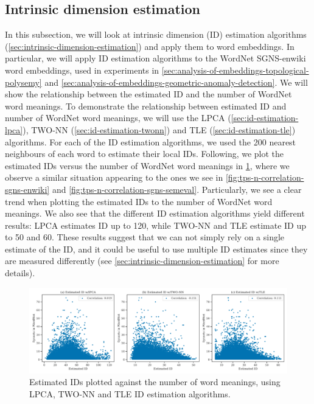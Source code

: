 \subsection{Intrinsic dimension estimation}
\label{sec:analysis-of-embeddings-intrinsic-dimension-estimation}
In this subsection, we will look at intrinsic dimension (ID) estimation algorithms (\cref{sec:intrinsic-dimension-estimation}) and apply them to word embeddings. In particular, we will apply ID estimation algorithms to the WordNet SGNS-enwiki word embeddings, used in experiments in \cref{sec:analysis-of-embeddings-topological-polysemy} and \cref{sec:analysis-of-embeddings-geometric-anomaly-detection}. We will show the relationship between the estimated ID and the number of WordNet word meanings. To demonstrate the relationship between estimated ID and number of WordNet word meanings, we will use the LPCA (\cref{sec:id-estimation-lpca}), TWO-NN (\cref{sec:id-estimation-twonn}) and TLE (\cref{sec:id-estimation-tle}) algorithms. For each of the ID estimation algorithms, we used the 200 nearest neighbours of each word to estimate their local IDs. Following, we plot the estimated IDs versus the number of WordNet word meanings in \cref{fig:intrinsic-dimension-estimation-vs-wordnet-synsets}, where we observe a similar situation appearing to the ones we see in \cref{fig:tps-n-correlation-sgns-enwiki} and \cref{fig:tps-n-correlation-sgns-semeval}. Particularly, we see a clear trend when plotting the estimated IDs to the number of WordNet word meanings. We also see that the different ID estimation algorithms yield different results: LPCA estimates ID up to 120, while TWO-NN and TLE estimate ID up to 50 and 60. These results suggest that we can not simply rely on a single estimate of the ID, and it could be useful to use multiple ID estimates since they are measured differently (see \cref{sec:intrinsic-dimension-estimation} for more details).
\begin{figure}[H]
    \centering
    \includegraphics[width=\textwidth]{thesis/figures/intrinsic-dimension-estimation-vs-wordnet-synsets.pdf}
    \caption{Estimated IDs plotted against the number of word meanings, using LPCA, TWO-NN and TLE ID estimation algorithms.}
    \label{fig:intrinsic-dimension-estimation-vs-wordnet-synsets}
\end{figure}

